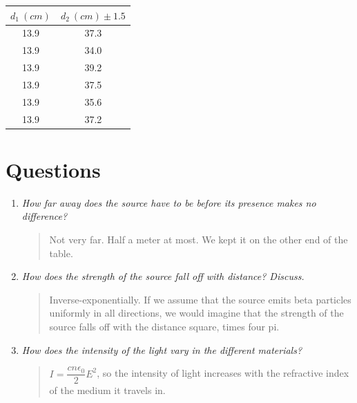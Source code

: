 \documentclass{amsart}
\begin{document}
\begin{table}[H]
\begin{minipage}{0.3\textwidth}
\begin{tabular}{c|c}
        $d_1 \unit{\ (cm)}$            & $d_2 \unit{\ (cm)} \pm 1.5$ \\ \hline
        13.9                       & 37.3                    \\
        13.9                       & 34.0                    \\
        13.9                       & 39.2                    \\
        13.9                       & 37.5                    \\
        13.9                       & 35.6                    \\
        13.9                       & 37.2
        \end{tabular}
    \end{minipage}
\end{table}

%
%
\section{Questions}

\begin{enumerate}
\item {\textit{How far away does the source have to be before its presence makes no difference?}
\begin{quote}
    Not very far. Half a meter at most. We kept it on the other end of the table.
\end{quote}}

\item{\textit{How does the strength of the source fall off with distance? Discuss.}
\begin{quote}
    Inverse-exponentially. If we assume that the source emits beta particles uniformly in all directions, we would imagine that the strength of the source falls off with the distance square, times four pi.
\end{quote}}

\item{\textit{How does the intensity of the light vary in the different materials?}
\begin{quote}
    $I = \dfrac{cn\epsilon_0}{2}E^2$, so the intensity of light increases with the refractive index of the medium it travels in.
\end{quote}}

\end{enumerate}
\end{document}
